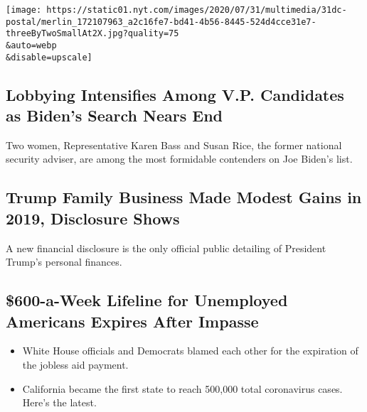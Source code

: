 \href{/2020/07/31/us/politics/trump-usps-mail-delays.html}{}

\texttt{[image: https://static01.nyt.com/images/2020/07/31/multimedia/31dc-postal/merlin\_172107963\_a2c16fe7-bd41-4b56-8445-524d4cce31e7-threeByTwoSmallAt2X.jpg?quality=75\\\&auto=webp\\\&disable=upscale]}

\href{/2020/07/31/us/politics/joseph-biden-vice-president.html}{}

\hypertarget{lobbying-intensifies-among-vp-candidates-as-bidens-search-nears-end}{%
\subsection{Lobbying Intensifies Among V.P. Candidates as Biden's Search
Nears
End}\label{lobbying-intensifies-among-vp-candidates-as-bidens-search-nears-end}}

Two women, Representative Karen Bass and Susan Rice, the former national
security adviser, are among the most formidable contenders on Joe
Biden's list.

\href{/2020/07/31/business/trump-financial-disclosure.html}{}

\hypertarget{trump-family-business-made-modest-gains-in-2019-disclosure-shows}{%
\subsection{Trump Family Business Made Modest Gains in 2019, Disclosure
Shows}\label{trump-family-business-made-modest-gains-in-2019-disclosure-shows}}

A new financial disclosure is the only official public detailing of
President Trump's personal finances.

\href{/2020/07/31/world/coronavirus-covid-19.html}{}

\hypertarget{600-a-week-lifeline-for-unemployed-americans-expires-after-impasse}{%
\subsection{\$600-a-Week Lifeline for Unemployed Americans Expires After
Impasse}\label{600-a-week-lifeline-for-unemployed-americans-expires-after-impasse}}

\begin{itemize}
\tightlist
\item
  White House officials and Democrats blamed each other for the
  expiration of the jobless aid payment.
\item
  California became the first state to reach 500,000 total coronavirus
  cases. Here's the latest.
\end{itemize}

